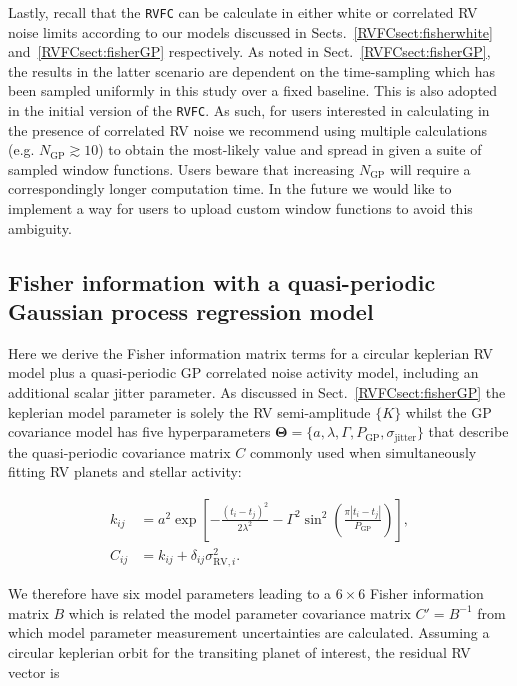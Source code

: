 Lastly, recall that the
\texttt{RVFC} can be calculate \nrv{} in either white or correlated RV noise limits according to
our models discussed in Sects.~\ref{RVFCsect:fisherwhite} and~\ref{RVFCsect:fisherGP} respectively. As noted in
Sect.~\ref{RVFCsect:fisherGP}, the results in the latter scenario are dependent on the time-sampling which has
been sampled uniformly in this study over a fixed baseline. This is also adopted in the initial version of
the \texttt{RVFC}. As such, for users interested in calculating \nrv{} in the presence of correlated RV noise
we recommend using multiple calculations (e.g. $N_{\text{GP}} \gtrsim 10$) to obtain the most-likely value and
spread in \nrv{} given a suite of sampled window functions. Users beware that increasing $N_{\text{GP}}$ will
require a correspondingly longer computation time.  
In the future we would like to implement a way for users to upload custom window functions to avoid this
ambiguity. 


\subsection{Fisher information with a quasi-periodic Gaussian process regression model} \label{RVFCapp:fishergp}
Here we derive the Fisher information matrix terms for a circular keplerian RV model
plus a quasi-periodic GP correlated noise activity model, including an additional scalar jitter parameter.
As discussed in Sect.~\ref{RVFCsect:fisherGP}
the keplerian model parameter is solely the RV semi-amplitude $\{K \}$ whilst the GP covariance model has
five hyperparameters $\boldsymbol{\Theta} = \{a, \lambda, \Gamma, P_{\text{GP}}, \sigma_{\text{jitter}} \}$
that describe the quasi-periodic covariance matrix $C$ commonly used when simultaneously fitting RV planets
and stellar activity:

\begin{align}
  k_{ij} &= a^2 \exp{\left[ -\frac{(t_i-t_j)^2}{2 \lambda^2}
      -\Gamma^2 \sin^2{\left(\frac{\pi |t_i-t_j|}{P_{\text{GP}}} \right)} \right]}, \label{appeq:K1} \\
  C_{ij} &= k_{ij} + \delta_{ij} \sigma_{\text{RV},i}^2. \label{appeq:K2}
\end{align}
  
\noindent We therefore
have six model parameters leading to a $6 \times 6$ Fisher information matrix $B$ which is related
the model parameter covariance matrix $C'=B^{-1}$ from which model parameter measurement uncertainties
are calculated. Assuming a circular keplerian orbit for the transiting planet of interest, the residual
RV vector is

